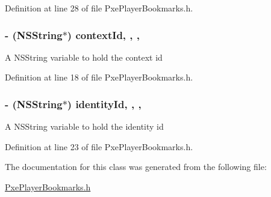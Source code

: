 Definition at line 28 of file Pxe\-Player\-Bookmarks.\-h.

\hypertarget{interface_pxe_player_bookmarks_a7cae98aa1c704bcf06ebeb3849b58172}{
\subsubsection[{context\-Id}]{\setlength{\rightskip}{0pt plus 5cm}-\/ (N\-S\-String$\ast$) context\-Id\hspace{0.3cm}{\ttfamily [read]}, {\ttfamily [write]}, {\ttfamily [nonatomic]}, {\ttfamily [strong]}}}\label{interface_pxe_player_bookmarks_a7cae98aa1c704bcf06ebeb3849b58172}
A N\-S\-String variable to hold the context id 

Definition at line 18 of file Pxe\-Player\-Bookmarks.\-h.

\hypertarget{interface_pxe_player_bookmarks_a44a7ebbd3c3d8848820951f2256f6fff}{
\subsubsection[{identity\-Id}]{\setlength{\rightskip}{0pt plus 5cm}-\/ (N\-S\-String$\ast$) identity\-Id\hspace{0.3cm}{\ttfamily [read]}, {\ttfamily [write]}, {\ttfamily [nonatomic]}, {\ttfamily [strong]}}}\label{interface_pxe_player_bookmarks_a44a7ebbd3c3d8848820951f2256f6fff}
A N\-S\-String variable to hold the identity id 

Definition at line 23 of file Pxe\-Player\-Bookmarks.\-h.



The documentation for this class was generated from the following file\-:\begin{DoxyCompactItemize}
\item 
\hyperlink{_pxe_player_bookmarks_8h}{Pxe\-Player\-Bookmarks.\-h}\end{DoxyCompactItemize}
